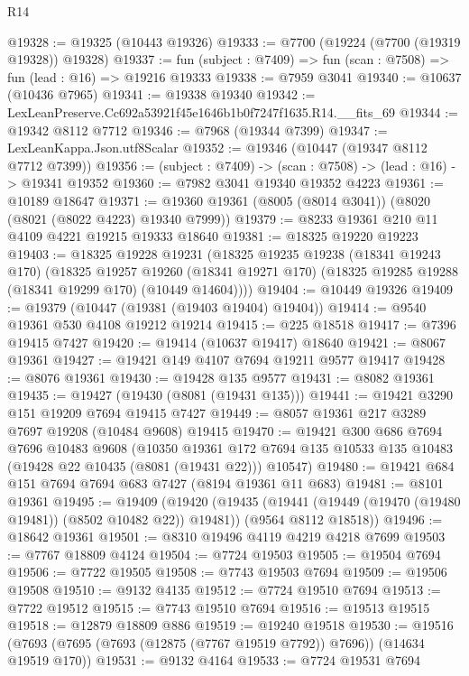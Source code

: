 \begin{lexlean}{R14}
\begin{coremodule}
@19328 := @19325 (@10443 @19326)
@19333 := @7700 (@19224 (@7700 (@19319 @19328)) @19328)
@19337 := fun (subject : @7409) => fun (scan : @7508) => fun (lead : @16) => @19216 @19333
@19338 := @7959 @3041
@19340 := @10637 (@10436 @7965)
@19341 := @19338 @19340
@19342 := LexLeanPreserve.Cc692a53921f45e1646b1b0f7247f1635.R14.__fits_69
@19344 := @19342 @8112 @7712
@19346 := @7968 (@19344 @7399)
@19347 := LexLeanKappa.Json.utf8Scalar
@19352 := @19346 (@10447 (@19347 @8112 @7712 @7399))
@19356 := (subject : @7409) -> (scan : @7508) -> (lead : @16) -> @19341 @19352
@19360 := @7982 @3041 @19340 @19352 @4223
@19361 := @10189 @18647
@19371 := @19360 @19361 (@8005 (@8014 @3041)) (@8020 (@8021 (@8022 @4223) @19340 @7999))
@19379 := @8233 @19361 @210 @11 @4109 @4221 @19215 @19333 @18640
@19381 := @18325 @19220 @19223
@19403 := @18325
    @19228
    @19231
    (@18325
      @19235
      @19238
      (@18341 @19243 @170)
      (@18325
        @19257
        @19260
        (@18341 @19271 @170)
        (@18325 @19285 @19288 (@18341 @19299 @170) (@10449 @14604))))
@19404 := @10449 @19326
@19409 := @19379 (@10447 (@19381 (@19403 @19404) @19404))
@19414 := @9540 @19361 @530 @4108 @19212 @19214
@19415 := @225 @18518
@19417 := @7396 @19415 @7427
@19420 := @19414 (@10637 @19417) @18640
@19421 := @8067 @19361
@19427 := @19421 @149 @4107 @7694 @19211 @9577 @19417
@19428 := @8076 @19361
@19430 := @19428 @135 @9577
@19431 := @8082 @19361
@19435 := @19427 (@19430 (@8081 (@19431 @135)))
@19441 := @19421 @3290 @151 @19209 @7694 @19415 @7427
@19449 := @8057 @19361 @217 @3289 @7697 @19208 (@10484 @9608) @19415
@19470 := @19421
    @300
    @686
    @7694
    @7696
    @10483
    @9608
    (@10350
      @19361
      @172
      @7694
      @135
      @10533
      @135
      @10483
      (@19428 @22 @10435 (@8081 (@19431 @22)))
      @10547)
@19480 := @19421 @684 @151 @7694 @7694 @683 @7427 (@8194 @19361 @11 @683)
@19481 := @8101 @19361
@19495 := @19409
    (@19420
      (@19435 (@19441 (@19449 (@19470 (@19480 @19481)) (@8502 @10482 @22)) @19481))
      (@9564 @8112 @18518))
@19496 := @18642 @19361
@19501 := @8310 @19496 @4119 @4219 @4218 @7699
@19503 := @7767 @18809 @4124
@19504 := @7724 @19503
@19505 := @19504 @7694
@19506 := @7722 @19505
@19508 := @7743 @19503 @7694
@19509 := @19506 @19508
@19510 := @9132 @4135
@19512 := @7724 @19510 @7694
@19513 := @7722 @19512
@19515 := @7743 @19510 @7694
@19516 := @19513 @19515
@19518 := @12879 @18809 @886
@19519 := @19240 @19518
@19530 := @19516 (@7693 (@7695 (@7693 (@12875 (@7767 @19519 @7792)) @7696)) (@14634 @19519 @170))
@19531 := @9132 @4164
@19533 := @7724 @19531 @7694

\end{coremodule}
\end{lexlean}
